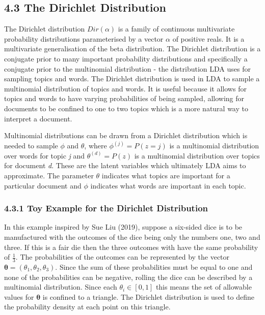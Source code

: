 \documentclass[
]{article}
\begin{document}
\hypertarget{the-dirichlet-distribution}{%
\subsection{4.3 The Dirichlet
Distribution}\label{the-dirichlet-distribution}}

The Dirichlet distribution \(Dir(\alpha)\) is a family of continuous
multivariate probability distributions parameterised by a vector
\(\alpha\) of positive reals. It is a multivariate generalisation of the
beta distribution. The Dirichlet distribution is a conjugate prior to
many important probability distributions and specifically a conjugate
prior to the multinomial distribution - the distribution LDA uses for
sampling topics and words. The Dirichlet distribution is used in LDA to
sample a multinomial distribution of topics and words. It is useful
because it allows for topics and words to have varying probabilities of
being sampled, allowing for documents to be confined to one to two
topics which is a more natural way to interpret a document.

Multinomial distributions can be drawn from a Dirichlet distribution
which is needed to sample \(\phi\) and \(\theta\), where
\({\phi}^{(j)} = P(z=j)\) is a multinomial distribution over words for
topic \emph{j} and \({\theta}^{(d)} = P(z)\) is a multinomial
distribution over topics for document \emph{d}. These are the latent
variables which ultimately LDA aims to approximate. The parameter
\(\theta\) indicates what topics are important for a particular document
and \(\phi\) indicates what words are important in each topic.

\hypertarget{toy-example-for-the-dirichlet-distribution}{%
\subsubsection{4.3.1 Toy Example for the Dirichlet
Distribution}\label{toy-example-for-the-dirichlet-distribution}}

In this example inspired by Sue Liu (2019), suppose a six-sided dice is
to be manufactured with the outcomes of the dice being only the numbers
one, two and three. If this is a fair die then the three outcomes with
have the same probability of \(\frac{1}{3}\). The probabilities of the
outcomes can be represented by the vector
\(\boldsymbol{\mathbf{\theta}} = (\theta_{1}, \theta_{2}, \theta_{3})\).
Since the sum of these probabilities must be equal to one and none of
the probabilities can be negative, rolling the dice can be described by
a multinomial distribution. Since each \(\theta_{i} \in [0,1]\) this
means the set of allowable values for \(\boldsymbol{\mathbf{\theta}}\)
is confined to a triangle. The Dirichlet distribution is used to define
the probability density at each point on this triangle.
\end{document}
